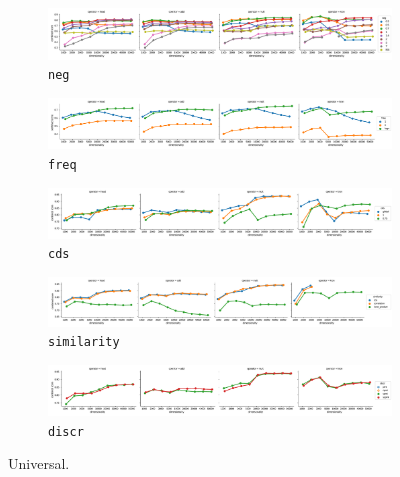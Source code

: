 \begin{figure}
  \centering

  \begin{subfigure}[t]{\textwidth}
    \includegraphics[width=1.1\textwidth]{supplement/figures/universal-interaction-neg}

  \caption{\texttt{neg}}
  \label{fig:universal-neg}
  \end{subfigure}

  \begin{subfigure}[t]{\textwidth}
    \includegraphics[width=1.1\textwidth]{supplement/figures/universal-interaction-freq}

  \caption{\texttt{freq}}
  \label{fig:universal-freq}
  \end{subfigure}

  \begin{subfigure}[t]{\textwidth}
    \includegraphics[width=1.1\textwidth]{supplement/figures/universal-interaction-cds}

  \caption{\texttt{cds}}
  \label{fig:universal-cds}
  \end{subfigure}

  \begin{subfigure}[t]{\textwidth}
  \includegraphics[width=1.1\textwidth]{supplement/figures/universal-interaction-similarity}

  \caption{\texttt{similarity}}
  \label{fig:universal-similarity}
  \end{subfigure}

  \begin{subfigure}[t]{\textwidth}
  \includegraphics[width=1.1\textwidth]{supplement/figures/universal-interaction-discr}

  \caption{\texttt{discr}}
  \label{fig:universal-discr}
  \end{subfigure}

  \caption{Universal.}
  \label{fig:universal-parameters}
\end{figure}
